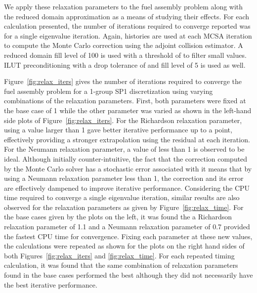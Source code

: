 We apply these relaxation parameters to the fuel assembly problem
along with the reduced domain approximation as a means of studying
their effects. For each calculation presented, the number of
iterations required to converge reported was for a single eigenvalue
iteration.  Again,  histories are used at each MCSA iteration
to compute the Monte Carlo correction using the adjoint collision
estimator. A reduced domain fill level of 100 is used with a threshold
of  to filter small values. ILUT preconditioning with a
drop tolerance of  and fill level of 5 is used as
well. 

Figure~\ref{fig:relax_iters} gives the number of iterations required
to converge the fuel assembly problem for a 1-group SP1 discretization
using varying combinations of the relaxation parameters. First, both
parameters were fixed at the base case of 1 while the other parameter
was varied as shown in the left-hand side plots of
Figure~\ref{fig:relax_iters}. For the Richardson relaxation parameter,
using a value larger than 1 gave better iterative performance up to a
point, effectively providing a stronger extrapolation using the
residual at each iteration. For the Neumann relaxation parameter, a
value of less than 1 is observed to be ideal. Although initially
counter-intuitive, the fact that the correction computed by the Monte
Carlo solver has a stochastic error associated with it means that by
using a Neumann relaxation parameter less than 1, the correction and
its error are effectively dampened to improve iterative
performance. Considering the CPU time required to converge a single
eigenvalue iteration, similar results are also observed for the
relaxation parameters as given by Figure~\ref{fig:relax_time}. For the
base cases given by the plots on the left, it was found the a
Richardson relaxation parameter of 1.1 and a Neumann relaxation
parameter of 0.7 provided the fastest CPU time for convergence. Fixing
each parameter at these new values, the calculations were repeated as
shown for the plots on the right hand sides of both
Figures~\ref{fig:relax_iters} and \ref{fig:relax_time}. For each
repeated timing calculation, it was found that the same combination of
relaxation parameters found in the base cases performed the best
although they did not necessarily have the best iterative performance.

